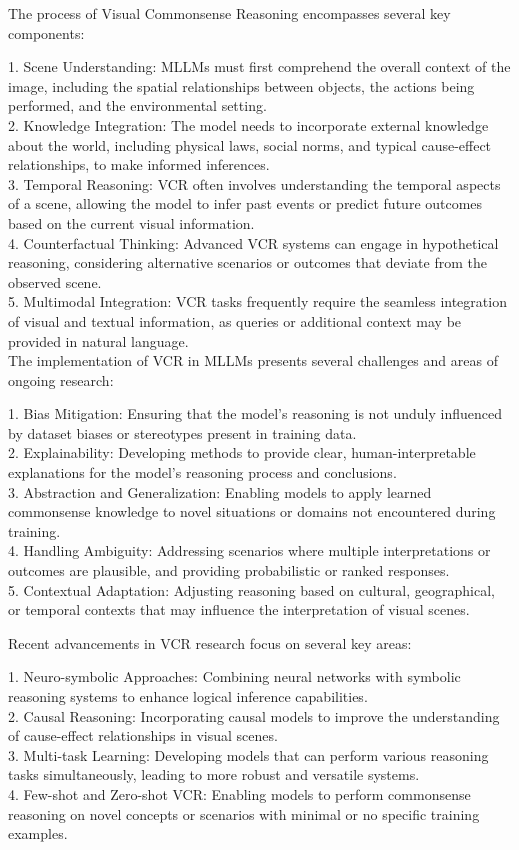 The process of Visual Commonsense Reasoning encompasses several key components:

1. Scene Understanding: MLLMs must first comprehend the overall context of the image, including the spatial relationships between objects, the actions being performed, and the environmental setting.
\\
2. Knowledge Integration: The model needs to incorporate external knowledge about the world, including physical laws, social norms, and typical cause-effect relationships, to make informed inferences.
\\
3. Temporal Reasoning: VCR often involves understanding the temporal aspects of a scene, allowing the model to infer past events or predict future outcomes based on the current visual information.
\\
4. Counterfactual Thinking: Advanced VCR systems can engage in hypothetical reasoning, considering alternative scenarios or outcomes that deviate from the observed scene.
\\
5. Multimodal Integration: VCR tasks frequently require the seamless integration of visual and textual information, as queries or additional context may be provided in natural language.
\\
The implementation of VCR in MLLMs presents several challenges and areas of ongoing research:

1. Bias Mitigation: Ensuring that the model's reasoning is not unduly influenced by dataset biases or stereotypes present in training data.
\\
2. Explainability: Developing methods to provide clear, human-interpretable explanations for the model's reasoning process and conclusions.
\\
3. Abstraction and Generalization: Enabling models to apply learned commonsense knowledge to novel situations or domains not encountered during training.
\\
4. Handling Ambiguity: Addressing scenarios where multiple interpretations or outcomes are plausible, and providing probabilistic or ranked responses.
\\
5. Contextual Adaptation: Adjusting reasoning based on cultural, geographical, or temporal contexts that may influence the interpretation of visual scenes.

Recent advancements in VCR research focus on several key areas:

1. Neuro-symbolic Approaches: Combining neural networks with symbolic reasoning systems to enhance logical inference capabilities.
\\
2. Causal Reasoning: Incorporating causal models to improve the understanding of cause-effect relationships in visual scenes.
\\
3. Multi-task Learning: Developing models that can perform various reasoning tasks simultaneously, leading to more robust and versatile systems.
\\
4. Few-shot and Zero-shot VCR: Enabling models to perform commonsense reasoning on novel concepts or scenarios with minimal or no specific training examples.

